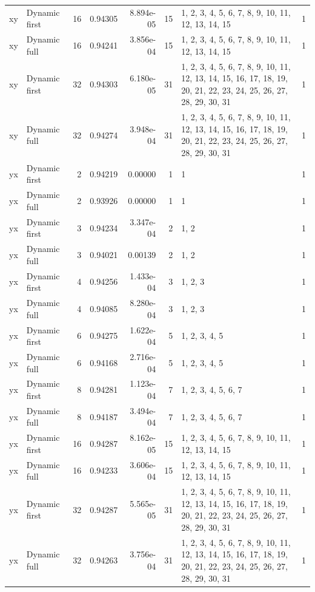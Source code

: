 \documentclass[10pt,a4paper]{article}
\begin{document}
\begin{longtable}{@{}p{23mm}p{29mm}rrrrp{36mm}r@{}}
xy & Dynamic first & 16 & 0.94305 & 8.894e-05 & 15 & 1, 2, 3, 4, 5, 6, 7, 8, 9, 10, 11, 12, 13, 14, 15 & 1 \\
xy & Dynamic full & 16 & 0.94241 & 3.856e-04 & 15 & 1, 2, 3, 4, 5, 6, 7, 8, 9, 10, 11, 12, 13, 14, 15 & 1 \\
xy & Dynamic first & 32 & 0.94303 & 6.180e-05 & 31 & 1, 2, 3, 4, 5, 6, 7, 8, 9, 10, 11, 12, 13, 14, 15, 16, 17, 18, 19, 20, 21, 22, 23, 24, 25, 26, 27, 28, 29, 30, 31 & 1 \\
xy & Dynamic full & 32 & 0.94274 & 3.948e-04 & 31 & 1, 2, 3, 4, 5, 6, 7, 8, 9, 10, 11, 12, 13, 14, 15, 16, 17, 18, 19, 20, 21, 22, 23, 24, 25, 26, 27, 28, 29, 30, 31 & 1 \\
yx & Dynamic first & 2 & 0.94219 & 0.00000 & 1 & 1 & 1 \\
yx & Dynamic full & 2 & 0.93926 & 0.00000 & 1 & 1 & 1 \\
yx & Dynamic first & 3 & 0.94234 & 3.347e-04 & 2 & 1, 2 & 1 \\
yx & Dynamic full & 3 & 0.94021 & 0.00139 & 2 & 1, 2 & 1 \\
yx & Dynamic first & 4 & 0.94256 & 1.433e-04 & 3 & 1, 2, 3 & 1 \\
yx & Dynamic full & 4 & 0.94085 & 8.280e-04 & 3 & 1, 2, 3 & 1 \\
yx & Dynamic first & 6 & 0.94275 & 1.622e-04 & 5 & 1, 2, 3, 4, 5 & 1 \\
yx & Dynamic full & 6 & 0.94168 & 2.716e-04 & 5 & 1, 2, 3, 4, 5 & 1 \\
yx & Dynamic first & 8 & 0.94281 & 1.123e-04 & 7 & 1, 2, 3, 4, 5, 6, 7 & 1 \\
yx & Dynamic full & 8 & 0.94187 & 3.494e-04 & 7 & 1, 2, 3, 4, 5, 6, 7 & 1 \\
yx & Dynamic first & 16 & 0.94287 & 8.162e-05 & 15 & 1, 2, 3, 4, 5, 6, 7, 8, 9, 10, 11, 12, 13, 14, 15 & 1 \\
yx & Dynamic full & 16 & 0.94233 & 3.606e-04 & 15 & 1, 2, 3, 4, 5, 6, 7, 8, 9, 10, 11, 12, 13, 14, 15 & 1 \\
yx & Dynamic first & 32 & 0.94287 & 5.565e-05 & 31 & 1, 2, 3, 4, 5, 6, 7, 8, 9, 10, 11, 12, 13, 14, 15, 16, 17, 18, 19, 20, 21, 22, 23, 24, 25, 26, 27, 28, 29, 30, 31 & 1 \\
yx & Dynamic full & 32 & 0.94263 & 3.756e-04 & 31 & 1, 2, 3, 4, 5, 6, 7, 8, 9, 10, 11, 12, 13, 14, 15, 16, 17, 18, 19, 20, 21, 22, 23, 24, 25, 26, 27, 28, 29, 30, 31 & 1 \\
\end{longtable}\normalsize\setlength{\tabcolsep}{6pt}
\clearpage
\end{document}
